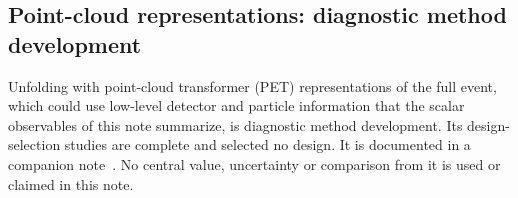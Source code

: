 \subsection{Point-cloud representations: diagnostic method development}
\label{sec:pet}

Unfolding with point-cloud transformer (PET) representations of the full event, which could use low-level detector and particle information that the scalar observables of this note summarize, is diagnostic method development. Its design-selection studies are complete and selected no design. It is documented in a companion note~\cite{PETNote2026}. No central value, uncertainty or comparison from it is used or claimed in this note.
